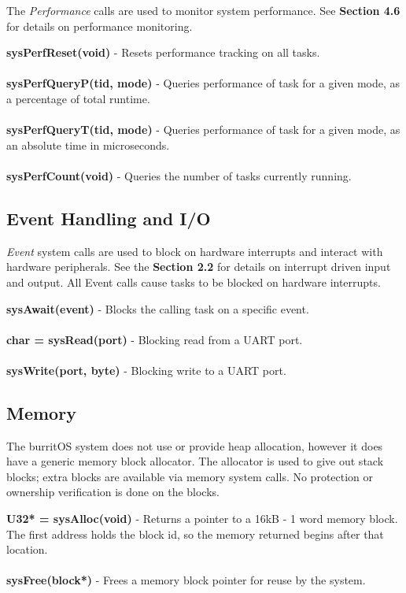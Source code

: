 \documentclass[twoside,a4paper]{refart}
\begin{document}
The \textit{Performance} calls are used to monitor system performance. See \textbf{Section 4.6} for details on performance monitoring.

\textbf{sysPerfReset(void)} - Resets performance tracking on all tasks.\\\\
\textbf{sysPerfQueryP(tid, mode)} - Queries performance of task for a given mode, as a percentage of total runtime.\\\\
\textbf{sysPerfQueryT(tid, mode)} - Queries performance of task for a given mode, as an absolute time in microseconds.\\\\
\textbf{sysPerfCount(void)} - Queries the number of tasks currently running.

\subsection{Event Handling and I/O}

\textit{Event} system calls are used to block on hardware interrupts and interact with hardware peripherals. See the \textbf{Section 2.2} for details on interrupt driven input and output. All Event calls cause tasks to be blocked on hardware interrupts.

\textbf{sysAwait(event)} - Blocks the calling task on a specific event.\\\\
\textbf{char = sysRead(port)} - Blocking read from a UART port.\\\\
\textbf{sysWrite(port, byte)} - Blocking write to a UART port.

\subsection{Memory}

The burritOS system does not use or provide heap allocation, however it does have a generic memory block allocator. The allocator is used to give out stack blocks; extra blocks are available via memory system calls. No protection or ownership verification is done on the blocks.

\textbf{U32* = sysAlloc(void)} - Returns a pointer to a 16kB - 1 word memory block. The first address holds the block id, so the memory returned begins after that location.\\\\
\textbf{sysFree(block*)} - Frees a memory block pointer for reuse by the system.
\end{document}
